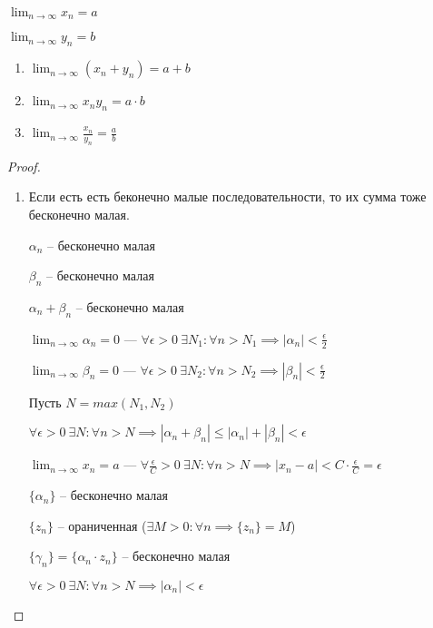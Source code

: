 \begin{statement}
    $\lim_{n \to \infty} x_n = a$

    $\lim_{n \to \infty} y_n = b$

    \begin{enumerate}
        \item $\lim_{n \to \infty} (x_n + y_n) = a + b$
        \item $\lim_{n \to \infty} x_n y_n = a \cdot b$
        \item $\lim_{n \to \infty} \frac{x_n}{y_n} = \frac{a}{b}$

    \end{enumerate}
\end{statement}

\begin{proof}~
    \begin{enumerate}
    \item 
        Если есть есть беконечно малые последовательности, то их сумма тоже бесконечно малая.
        
        $\alpha_n$ -- бесконечно малая
        
        $\beta_n$ -- бесконечно малая

        $\alpha_n + \beta_n$ -- бесконечно малая

        $\lim_{n \to \infty} \alpha_n = 0$ --- $\forall \epsilon > 0 \ \exists N_1 : \forall n > N_1 \implies |\alpha_n| < \frac{\epsilon}{2}$

        $\lim_{n \to \infty} \beta_n = 0$ --- $\forall \epsilon > 0 \ \exists N_2 : \forall n > N_2 \implies |\beta_n|< \frac{\epsilon}{2}$

        Пусть $N = max(N_1, N_2)$

        $\forall \epsilon > 0 \ \exists N : \forall n > N \implies |\alpha_n + \beta_n| \leq |\alpha_n| + |\beta_n| < \epsilon$
    
        $\lim_{n \to \infty} x_n = a$ --- $\forall \frac{\epsilon}{C} > 0 \ \exists N : \forall n > N \implies |x_n - a| < C \cdot \frac{\epsilon}{C} = \epsilon$

        $\{\alpha_n\}$ -- бесконечно малая

        $\{z_n\}$ -- ораниченная
        ($\exists M > 0 : \forall n \implies \{z_n\} = M$)

        $\{\gamma_n\} = \{\alpha_n \cdot z_n\}$ -- бесконечно малая

        $\forall \epsilon > 0 \ \exists N : \forall n > N \implies |\alpha_n| < \epsilon$


\end{enumerate}
\end{proof}
